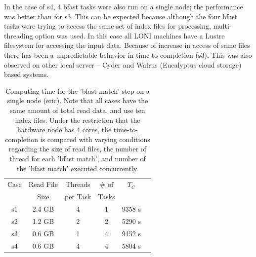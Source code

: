 \documentclass{sig-alternate}
\begin{document}

In the case of s4, 4 bfast tasks were also run on a single node; the
performance was better than for s3. This can be expected because
although the four bfast tasks were trying to access the same set of
index files for processing, multi-threading option was used.  In this
case all LONI machines have a Lustre filesystem for accessing the
input data.  Because of increase in access of same files there has
been a unpredictable behavior in time-to-completion (s3). This was
also observed on other local server -- Cyder and Walrus (Eucalyptus
cloud storage) based systems.






 \begin{table}
 \small
 \begin{tabular}{|c|c|c|c|c|c|} 
 \hline 
Case & Read File  & Threads & \# of   & $T_C$ \\
& Size &  per Task &  Tasks &   \\  \hline
s1 & 2.4 GB &  4 & 1 & 9358 s \\
s2 & 1.2 GB & 2 & 2 & 5290 s \\
s3 & 0.6 GB & 1 & 4 & 9152 s \\ 
s4& 0.6 GB & 4 & 4 & 5804 s \\

 \hline
 \end{tabular}
 
 \caption{Computing time for the 'bfast match' step on a single node
   (eric). Note that all cases have the same amount of total read
   data, and use ten index files.  Under the restriction that the
   hardware node has 4 cores, the time-to-completion is compared with
   varying conditions regarding the size of read files, the number of
   thread for each 'bfast match', and number of the 'bfast match'
   executed concurrently.  }
    \label{table:understandio}
\end{table}
\end{document}
